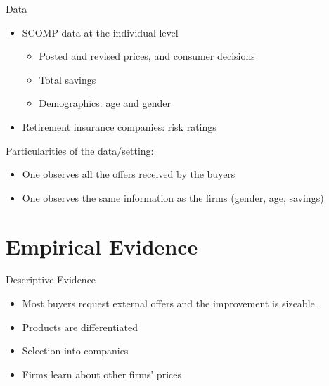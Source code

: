 \documentclass[10pt,aspectratio=169]{beamer}
\begin{document}
\begin{frame}{Data} \label{slide:data}
\begin{itemize}
    \item SCOMP data at the individual level  
    \begin{itemize}
        \item Posted and revised prices, and consumer decisions 
        \item Total savings 
        \item Demographics: age and gender \hyperlink{slide:fig5}{}
    \end{itemize}
     \item Retirement insurance companies: risk ratings
\end{itemize}

Particularities of the data/setting: 

\begin{itemize}
    \item One observes all the offers received by the buyers 
    \item One observes the same information as the firms (gender, age, savings)
\end{itemize}
\end{frame}



\section{Empirical Evidence}
 

\begin{frame}{Descriptive Evidence}\label{slide:Descriptive_evidence}
\begin{itemize}
    \item Most buyers request external offers and the improvement is sizeable. \hyperlink{slide:fig1}{} 
    \item Products are differentiated \hyperlink{slide:fig2}{} 
    \item Selection into companies \hyperlink{slide:fig3}{}
    \item Firms learn about other firms' prices  \hyperlink{slide:fig4}{} 
\end{itemize}
\end{frame}


\end{document}

